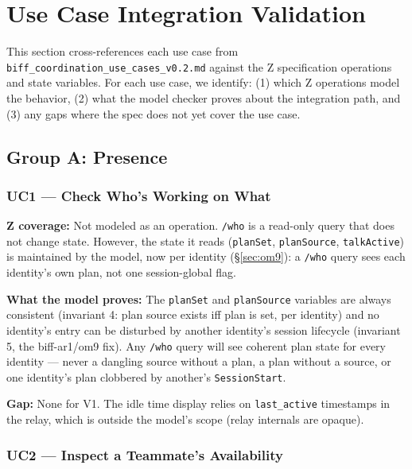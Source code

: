 \documentclass[a4paper,10pt,fleqn]{article}
\begin{document}
\section{Use Case Integration Validation}

This section cross-references each use case from
\texttt{biff\_coordination\_use\_cases\_v0.2.md} against the Z
specification operations and state variables. For each use case,
we identify: (1) which Z operations model the behavior, (2) what
the model checker proves about the integration path, and (3) any
gaps where the spec does not yet cover the use case.

\subsection{Group A: Presence}

\subsubsection{UC1 --- Check Who's Working on What}

\textbf{Z coverage:} Not modeled as an operation. \texttt{/who} is a
read-only query that does not change state. However, the state it reads
(\texttt{planSet}, \texttt{planSource}, \texttt{talkActive}) is maintained
by the model, now per identity (\S\ref{sec:om9}): a \texttt{/who} query
sees each identity's own plan, not one session-global flag.

\textbf{What the model proves:} The \texttt{planSet} and
\texttt{planSource} variables are always consistent (invariant 4:
plan source exists iff plan is set, per identity) and no identity's
entry can be disturbed by another identity's session lifecycle
(invariant 5, the biff-ar1/om9 fix). Any \texttt{/who} query will
see coherent plan state for every identity --- never a dangling
source without a plan, a plan without a source, or one identity's
plan clobbered by another's \texttt{SessionStart}.

\textbf{Gap:} None for V1. The idle time display relies on
\texttt{last\_active} timestamps in the relay, which is outside the
model's scope (relay internals are opaque).

\subsubsection{UC2 --- Inspect a Teammate's Availability}
\end{document}
